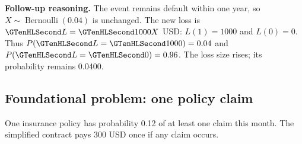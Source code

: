 \textbf{Follow-up reasoning.} The event remains default within one year, so $X\sim\operatorname{Bernoulli}(0.04)$ is unchanged. The new loss is $\Money{L}=\Money{1000}X$ USD: $L(1)=1000$ and $L(0)=0$. Thus $P(\Money{L}=\Money{1000})=0.04$ and $P(\Money{L}=\Money{0})=0.96$. The loss size rises; its probability remains 0.0400.

\clearpage
\subsection{Foundational problem: one policy claim}\label{prob:c3-claim}
One insurance policy has probability 0.12 of at least one claim this month. The simplified contract pays 300 USD once if any claim occurs.



